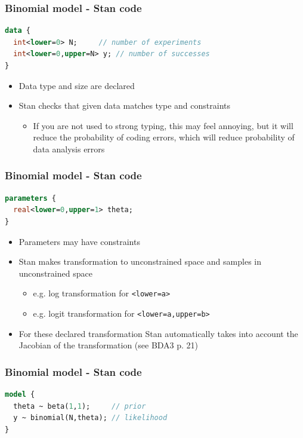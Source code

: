 \documentclass[10pt]{beamer}
\begin{document}
\begin{frame}[fragile]

\frametitle{Binomial model - Stan code}

  {\small
  \begin{lstlisting}[language=Stan]
data {
  int<lower=0> N;     // number of experiments
  int<lower=0,upper=N> y; // number of successes
}
\end{lstlisting}}

  \begin{itemize}
  \item Data type and size are declared
  \item Stan checks that given data matches type and constraints
    \begin{itemize}
    \item<2-> If you are not used to strong typing, this may
      feel annoying, but it will reduce the probability of coding
      errors, which will reduce probability of data analysis errors
    \end{itemize}
  \end{itemize}
\end{frame}


\begin{frame}[fragile]

\frametitle{Binomial model - Stan code}

  {\small
\begin{lstlisting}[language=Stan]
parameters {
  real<lower=0,upper=1> theta;
}
\end{lstlisting}}

  \begin{itemize}
  \item Parameters may have constraints
  \item Stan makes transformation to unconstrained space and samples in unconstrained space
    \begin{itemize}
    \item e.g. log transformation for \texttt{<lower=a>}
    \item e.g. logit transformation for \texttt{<lower=a,upper=b>}
    \end{itemize}
  \item<2-> For these declared transformation Stan automatically takes
    into account the Jacobian of the transformation (see BDA3 p. 21)
  \end{itemize}
\end{frame}

\begin{frame}[fragile]

\frametitle{Binomial model - Stan code}

  {\small
\begin{lstlisting}[language=Stan]
model {
  theta ~ beta(1,1);     // prior
  y ~ binomial(N,theta); // likelihood
}
\end{lstlisting}}

\end{frame}
\end{document}
